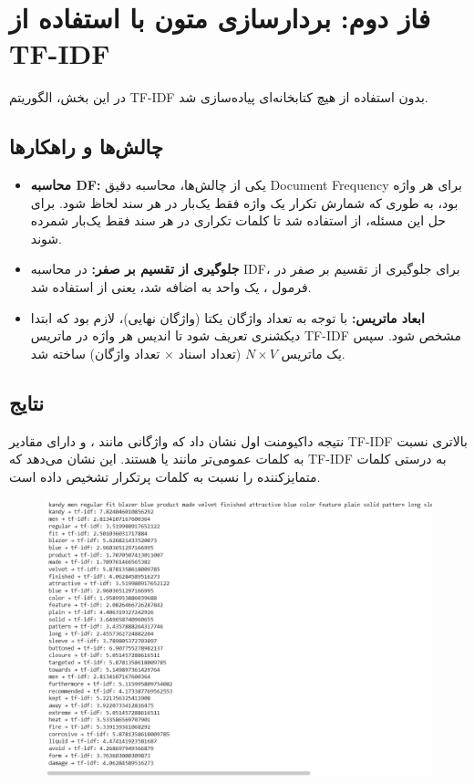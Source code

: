 \documentclass[a4paper,12pt]{article}
\let\nobreaksection\section
\renewcommand{\section}{\nobreaksection}
\begin{document}
	\section{فاز دوم: بردارسازی متون با استفاده از TF-IDF }
	

	در این بخش، الگوریتم TF-IDF بدون استفاده از هیچ کتابخانه‌ای پیاده‌سازی شد. 
	
	\subsection{چالش‌ها و راهکارها}
	\begin{itemize}
		\item \textbf{محاسبه DF:} یکی از چالش‌ها، محاسبه دقیق Document Frequency برای هر واژه بود، به طوری که شمارش تکرار یک واژه فقط یک‌بار در هر سند لحاظ شود. برای حل این مسئله، از  استفاده شد تا کلمات تکراری در هر سند فقط یک‌بار شمرده شوند.
		
		\item \textbf{جلوگیری از تقسیم بر صفر:} در محاسبه IDF، برای جلوگیری از تقسیم بر صفر در فرمول ، یک واحد به  اضافه شد، یعنی از  استفاده شد.
		
		\item \textbf{ابعاد ماتریس:} با توجه به تعداد واژگان یکتا (واژگان نهایی)، لازم بود که ابتدا دیکشنری  تعریف شود تا اندیس هر واژه در ماتریس TF-IDF مشخص شود. سپس یک ماتریس $N \times V$ (تعداد اسناد $\times$ تعداد واژگان) ساخته شد.
		
	\end{itemize}
	
	\subsection{نتایج}
	نتیجه داکیومنت اول نشان داد که واژگانی مانند ،  و  دارای مقادیر TF-IDF بالاتری نسبت به کلمات عمومی‌تر مانند  یا  هستند. این نشان می‌دهد که TF-IDF به درستی کلمات متمایزکننده را نسبت به کلمات پرتکرار تشخیص داده است.
		\begin{figure}[h]
		\centering
		\includegraphics[width=1\textwidth]{2-1.png}
	\end{figure}
	\FloatBarrier
	
\end{document}
